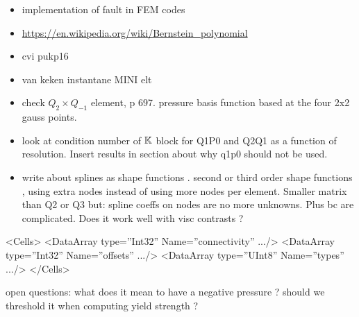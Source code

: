 \begin{itemize}
\item implementation of fault in FEM codes \cite{zhgu94,zhgu95}
\item \url{https://en.wikipedia.org/wiki/Bernstein_polynomial}
\item cvi pukp16
\item van keken instantane MINI elt
\item check $Q_2 \times Q_{-1}$ element, \cite{grsa} p 697. pressure basis function based at the four 2x2 gauss points.
\item look at condition number of ${\mathbb{K}}$ block for Q1P0 and Q2Q1 as a function of resolution. Insert results in section about why q1p0 should not be used. 
\item write about splines as shape functions \cite{chri92}. second or third order shape functions , using extra nodes instead of using more nodes per element. Smaller matrix than Q2 or Q3 but: spline coeffs on nodes are no more unknowns. Plus bc are complicated. Does it work well with visc contrasts ?

\end{itemize}

 <Cells>
      <DataArray type=”Int32” Name=”connectivity” .../>
      <DataArray type=”Int32” Name=”offsets” .../>
      <DataArray type=”UInt8” Name=”types” .../>
    </Cells>


open questions:
what does it mean to have a negative pressure ? should we threshold it when computing yield strength ? 
